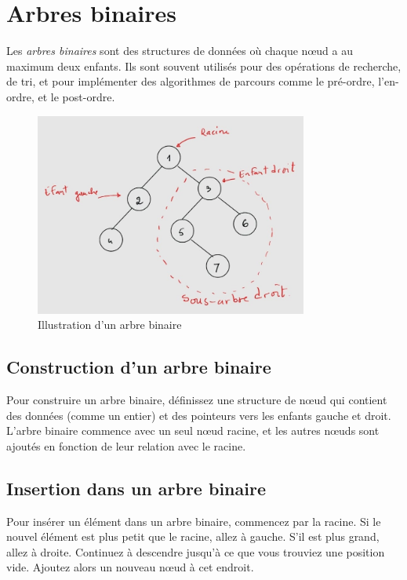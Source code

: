 \section{Arbres binaires}

Les \emph{arbres binaires} sont des structures de données où chaque nœud a au maximum deux enfants. Ils sont souvent utilisés pour des opérations de recherche, de tri, et pour implémenter des algorithmes de parcours comme le pré-ordre, l'en-ordre, et le post-ordre.

\begin{figure}[H]
	\centering
	 \includegraphics[width=0.8\textwidth]{image/binary_tree}  %
	\caption{Illustration d'un arbre binaire}
\end{figure}

\subsection{Construction d'un arbre binaire}
Pour construire un arbre binaire, définissez une structure de nœud qui contient des données (comme un entier) et des pointeurs vers les enfants gauche et droit. L'arbre binaire commence avec un seul nœud racine, et les autres nœuds sont ajoutés en fonction de leur relation avec le racine.

\subsection{Insertion dans un arbre binaire}
Pour insérer un élément dans un arbre binaire, commencez par la racine. Si le nouvel élément est plus petit que le racine, allez à gauche. S'il est plus grand, allez à droite. Continuez à descendre jusqu'à ce que vous trouviez une position vide. Ajoutez alors un nouveau nœud à cet endroit.

